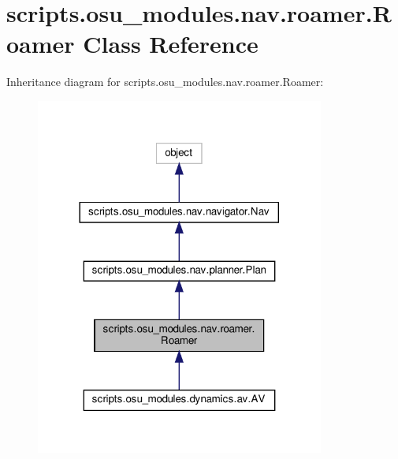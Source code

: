\hypertarget{classscripts_1_1osu__modules_1_1nav_1_1roamer_1_1Roamer}{}\section{scripts.\+osu\+\_\+modules.\+nav.\+roamer.\+Roamer Class Reference}
\label{classscripts_1_1osu__modules_1_1nav_1_1roamer_1_1Roamer}


Inheritance diagram for scripts.\+osu\+\_\+modules.\+nav.\+roamer.\+Roamer\+:
\nopagebreak
\begin{figure}[H]
\begin{center}
\leavevmode
\includegraphics[width=269pt]{dc/dcc/classscripts_1_1osu__modules_1_1nav_1_1roamer_1_1Roamer__inherit__graph}
\end{center}
\end{figure}


